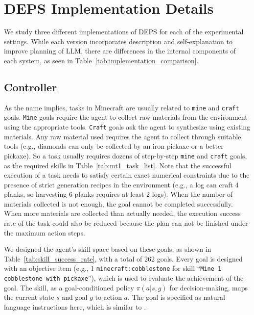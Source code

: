 \documentclass{article}
\begin{document}
\section{DEPS Implementation Details }\label{sec:controller}

We study three different implementations of DEPS for each of the experimental settings. While each version incorporates description and self-explanation to improve planning of LLM, there are differences in the internal components of each system, as seen in Table~\ref{tab:implementation_comparison}.



\subsection{Controller}

As the name implies, tasks in Minecraft are usually related to \texttt{mine} and \texttt{craft} goals.
\texttt{Mine} goals require the agent to collect raw materials from the environment using the appropriate tools.
\texttt{Craft} goals ask the agent to synthesize using existing materials. 
Any raw material used requires the agent to collect through suitable tools (e.g., diamonds can only be collected by an iron pickaxe or a better pickaxe).
So a task usually requires dozens of step-by-step \texttt{mine} and \texttt{craft} goals, as the required skills in Table~\ref{tab:mt1_task_list}. Note that the successful execution of a task needs to satisfy certain exact numerical constraints due to the presence of strict generation recipes in the environment (e.g., a log can craft 4 planks, so harvesting 6 planks requires at least 2 logs). 
When the number of materials collected is not enough, the goal cannot be completed successfully.
When more materials are collected than actually needed, the execution success rate of the task could also be reduced because the plan can not be finished under the maximum action steps. 



We designed the agent's skill space based on these goals, as shown in Table~\ref{tab:skill_success_rate}, with a total of 262 goals.
Every goal is designed with an objective item (e.g., 1 \texttt{minecraft:cobblestone} for skill ``\texttt{Mine 1 cobblestone with pickaxe}''), which is used to evaluate the achievement of the goal.
The skill, as a goal-conditioned policy $\pi(a|s, g)$ for decision-making, maps the current state $s$ and goal $g$ to action $a$. 
The goal is specified as natural language instructions here, which is similar to \cite{saycan}.
\end{document}
